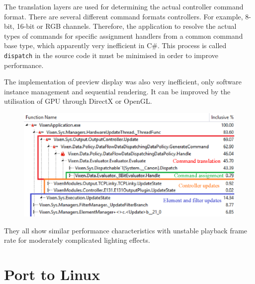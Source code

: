 The translation layers are used for determining the actual controller command format. There are several different command formats  controllers. For example, 8-bit, 16-bit or RGB channels. Therefore, the application  to resolve the actual types of commands for specific assignment handlers from a common command base type, which  apparently very inefficient in C\#. This process is called \texttt{dispatch} in the source code\ca{;} it must be minimised in order to improve performance.

The implementation of  preview display was also very inefficient,  only software instance management and sequential rendering. It can be improved by the utilisation of GPU through DirectX or OpenGL.


\begin{figure}[t]
  \centering
  \includegraphics[width=0.85\columnwidth]{Figs/vixen_perf_original_scheduler.eps}
  \caption{\footnotesize {}}
  \label{fig:vixen_perf_original_scheduler}
\end{figure}

 They all show similar performance characteristics with unstable playback frame rate for moderately complicated lighting effects.

\section{Port to Linux}

